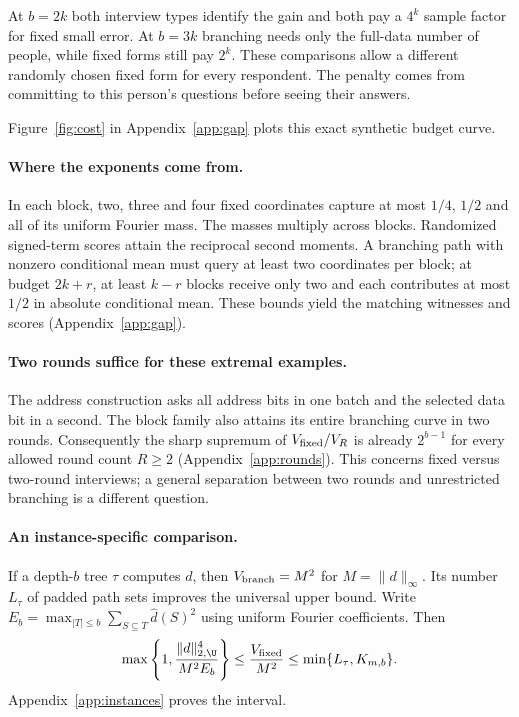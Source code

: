 At $b=2k$ both interview types identify the gain and both pay a $4^k$ sample factor for fixed small error. At $b=3k$ branching needs only the full-data number of people, while fixed forms still pay $2^k$. These comparisons allow a different randomly chosen fixed form for every respondent. The penalty comes from committing to this person's questions before seeing their answers.

Figure~\ref{fig:cost} in Appendix~\ref{app:gap} plots this exact synthetic budget curve.

\paragraph{Where the exponents come from.}
In each block, two, three and four fixed coordinates capture at most $1/4$, $1/2$ and all of its uniform Fourier mass. The masses multiply across blocks. Randomized signed-term scores attain the reciprocal second moments. A branching path with nonzero conditional mean must query at least two coordinates per block; at budget $2k+r$, at least $k-r$ blocks receive only two and each contributes at most $1/2$ in absolute conditional mean. These bounds yield the matching witnesses and scores (Appendix~\ref{app:gap}).

\paragraph{Two rounds suffice for these extremal examples.}
The address construction asks all address bits in one batch and the selected data bit in a second. The block family also attains its entire branching curve in two rounds. Consequently the sharp supremum of $V_{\rm fixed}/V_R$ is already $2^{b-1}$ for every allowed round count $R\ge2$ (Appendix~\ref{app:rounds}). This concerns fixed versus two-round interviews; a general separation between two rounds and unrestricted branching is a different question.


\paragraph{An instance-specific comparison.}
If a depth-$b$ tree $\tau$ computes $d$, then $V_{\rm branch}=M^2$ for $M=\|d\|_\infty$. Its number $L_\tau$ of padded path sets improves the universal upper bound. Write $E_b=\max_{|T|\le b}\sum_{S\subseteq T}\widehat d(S)^2$ using uniform Fourier coefficients. Then
\[
 \max\left\{1,\frac{\|d\|_{2,\U}^4}{M^2 E_b}\right\}
 \le\frac{V_{\rm fixed}}{M^2}\le\min\{L_\tau,K_{m,b}\}.
\]
Appendix~\ref{app:instances} proves the interval.


